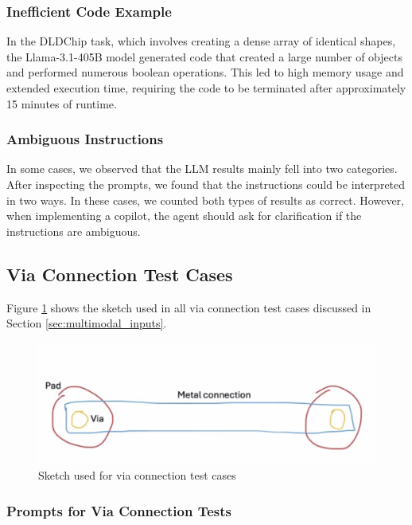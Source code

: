 \documentclass{article}
\begin{document}
\subsubsection{Inefficient Code Example}
\label{appendix:inefficient_code}

In the DLDChip task, which involves creating a dense array of identical shapes, the Llama-3.1-405B model generated code that created a large number of objects and performed numerous boolean operations. This led to high memory usage and extended execution time, requiring the code to be terminated after approximately 15 minutes of runtime.

\subsubsection{Ambiguous Instructions}
\label{appendix:ambiguous_instructions}

In some cases, we observed that the LLM results mainly fell into two categories. After inspecting the prompts, we found that the instructions could be interpreted in two ways. In these cases, we counted both types of results as correct. However, when implementing a copilot, the agent should ask for clarification if the instructions are ambiguous.

\subsection{Via Connection Test Cases}
\label{appendix:via_connection}

Figure \ref{fig:sketch} shows the sketch used in all via connection test cases discussed in Section \ref{sec:multimodal_inputs}.

\begin{figure}[h]
\centering
\includegraphics[width=0.5\linewidth]{sketch.png}
\caption{Sketch used for via connection test cases}
\label{fig:sketch}
\end{figure}

\subsubsection{Prompts for Via Connection Tests}
\label{appendix:via_prompts}
\end{document}
